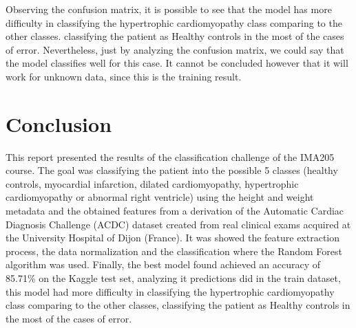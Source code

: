 \documentclass[conference]{IEEEtran}
\begin{document}
    Observing the confusion matrix, it is possible to see that the model has more
    difficulty in classifying the hypertrophic cardiomyopathy class comparing to the other classes.
    classifying the patient as Healthy controls in the most of the cases of error. 
    Nevertheless, just by analyzing the confusion matrix, we could say that the model classifies well for this case.
    It cannot be concluded however that it will work for unknown data, since this is the training result. 


\section{Conclusion}

    This report presented the results of the classification challenge of the IMA205 course. The goal was classifying 
    the patient into the possible 5 classes (healthy controls, myocardial infarction, dilated cardiomyopathy, hypertrophic 
    cardiomyopathy or abnormal right ventricle) using the height and weight metadata and the obtained features from a derivation 
    of the Automatic Cardiac Diagnosis Challenge (ACDC) dataset created from real clinical exams acquired at the University
    Hospital of Dijon (France). It was showed the feature extraction process, the data normalization and the classification
    where the Random Forest algorithm was used. Finally, the best model found achieved an accuracy of 85.71\% on the Kaggle 
    test set, analyzing it predictions did in the train dataset, this model had more difficulty in classifying the
    hypertrophic cardiomyopathy class comparing to the other classes, classifying the patient as Healthy controls in
    the most of the cases of error.   
   


\end{document}
